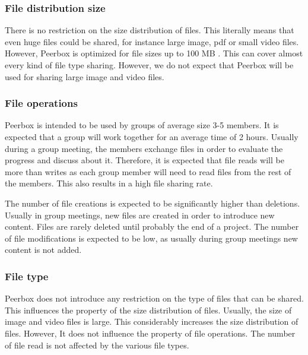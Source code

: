 \subsubsection{File distribution size}

There is no restriction on the size distribution of files. This literally means that even huge files could be shared, for instance large image, pdf or small video files. However, Peerbox is optimized for file sizes up to 100 MB . This can cover almost every kind of file type sharing. However, we do not expect that Peerbox will be used for sharing large image and video files.

\subsubsection{File operations}

Peerbox is intended to be used by groups of average size 3-5 members. It is expected that a group will work together for an average time of 2 hours. Usually during a group meeting, the members exchange files in order to evaluate the progress and discuss about it. Therefore, it is expected that file reads will be more than writes as each group member will need to read files from the rest of the members. This also results in a high file sharing rate.

The number of file creations is expected to be significantly higher than deletions. Usually in group meetings, new files are created in order to introduce new content. Files are rarely deleted until probably the end of a project. The number of file modifications is expected to be low, as usually during group meetings new content is not added.

\subsubsection{File type}

Peerbox does not introduce any restriction on the type of files that can be shared. This influences the property of the size distribution of files. Usually, the size of image and video files is large. This considerably increases the size distribution of files. However, It does not influence the property of file operations. The number of file read is not affected by the various file types.